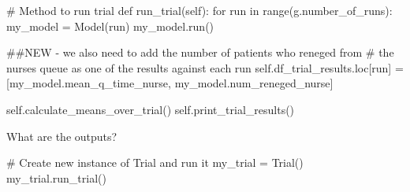 \documentclass[
  letterpaper,
  DIV=11,
  numbers=noendperiod]{scrreprt}
\newenvironment{Shaded}{\begin{snugshade}}{\end{snugshade}}
\newcommand{\BuiltInTok}[1]{\textcolor[rgb]{0.00,0.23,0.31}{#1}}
\newcommand{\CommentTok}[1]{\textcolor[rgb]{0.37,0.37,0.37}{#1}}
\newcommand{\ControlFlowTok}[1]{\textcolor[rgb]{0.00,0.23,0.31}{#1}}
\newcommand{\KeywordTok}[1]{\textcolor[rgb]{0.00,0.23,0.31}{#1}}
\newcommand{\NormalTok}[1]{\textcolor[rgb]{0.00,0.23,0.31}{#1}}
\newcommand{\OperatorTok}[1]{\textcolor[rgb]{0.37,0.37,0.37}{#1}}
\newcommand{\VariableTok}[1]{\textcolor[rgb]{0.07,0.07,0.07}{#1}}
\begin{document}
\begin{tcolorbox}
\begin{Shaded}
\begin{Highlighting}[]
    \CommentTok{\# Method to run trial}
    \KeywordTok{def}\NormalTok{ run\_trial(}\VariableTok{self}\NormalTok{):}
        \ControlFlowTok{for}\NormalTok{ run }\KeywordTok{in} \BuiltInTok{range}\NormalTok{(g.number\_of\_runs):}
\NormalTok{            my\_model }\OperatorTok{=}\NormalTok{ Model(run)}
\NormalTok{            my\_model.run()}

            \CommentTok{\#\#NEW {-} we also need to add the number of patients who reneged from}
            \CommentTok{\# the nurse\textquotesingle{}s queue as one of the results against each run}
            \VariableTok{self}\NormalTok{.df\_trial\_results.loc[run] }\OperatorTok{=}\NormalTok{ [my\_model.mean\_q\_time\_nurse,}
\NormalTok{                                              my\_model.num\_reneged\_nurse]}

        \VariableTok{self}\NormalTok{.calculate\_means\_over\_trial()}
        \VariableTok{self}\NormalTok{.print\_trial\_results()}
\end{Highlighting}
\end{Shaded}

\end{tcolorbox}

What are the outputs?

\begin{Shaded}
\begin{Highlighting}[]
\CommentTok{\# Create new instance of Trial and run it}
\NormalTok{my\_trial }\OperatorTok{=}\NormalTok{ Trial()}
\NormalTok{my\_trial.run\_trial()}
\end{Highlighting}
\end{Shaded}
\end{document}
